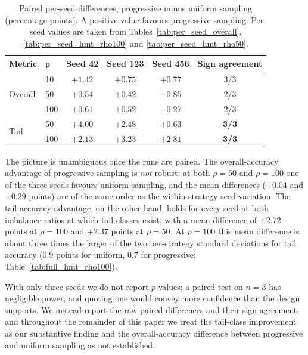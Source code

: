 \documentclass[12pt,a4paper]{article}
\begin{document}
\begin{table}[H]
    \centering
    \caption{Paired per-seed differences, progressive minus uniform sampling (percentage points). A positive value favours progressive sampling. Per-seed values are taken from Tables~\ref{tab:per_seed_overall}, \ref{tab:per_seed_hmt_rho100} and \ref{tab:per_seed_hmt_rho50}.}
    \label{tab:paired}
    \begin{threeparttable}
    \begin{tabular}{llcccc}
        \toprule
        \textbf{Metric} & $\boldsymbol{\rho}$ & \textbf{Seed 42} & \textbf{Seed 123} & \textbf{Seed 456} & \textbf{Sign agreement} \\
        \midrule
        \multirow{3}{*}{Overall}
        & 10  & $+1.42$ & $+0.75$ & $+0.77$ & 3/3 \\
        & 50  & $+0.54$ & $+0.42$ & $-0.85$ & 2/3 \\
        & 100 & $+0.61$ & $+0.52$ & $-0.27$ & 2/3 \\
        \midrule
        \multirow{2}{*}{Tail}
        & 50  & $+4.00$ & $+2.48$ & $+0.63$ & \textbf{3/3} \\
        & 100 & $+2.13$ & $+3.23$ & $+2.81$ & \textbf{3/3} \\
        \bottomrule
    \end{tabular}
    \end{threeparttable}
\end{table}

The picture is unambiguous once the runs are paired. The overall-accuracy advantage of progressive sampling is \emph{not} robust: at both $\rho = 50$ and $\rho = 100$ one of the three seeds favours uniform sampling, and the mean differences ($+0.04$ and $+0.29$ points) are of the same order as the within-strategy seed variation. The tail-accuracy advantage, on the other hand, holds for every seed at both imbalance ratios at which tail classes exist, with a mean difference of $+2.72$ points at $\rho = 100$ and $+2.37$ points at $\rho = 50$. At $\rho = 100$ this mean difference is about three times the larger of the two per-strategy standard deviations for tail accuracy ($0.9$ points for uniform, $0.7$ for progressive; Table~\ref{tab:full_hmt_rho100}).

With only three seeds we do not report $p$-values; a paired test on $n = 3$ has negligible power, and quoting one would convey more confidence than the design supports. We instead report the raw paired differences and their sign agreement, and throughout the remainder of this paper we treat the tail-class improvement as our substantive finding and the overall-accuracy difference between progressive and uniform sampling as not established.
\end{document}
